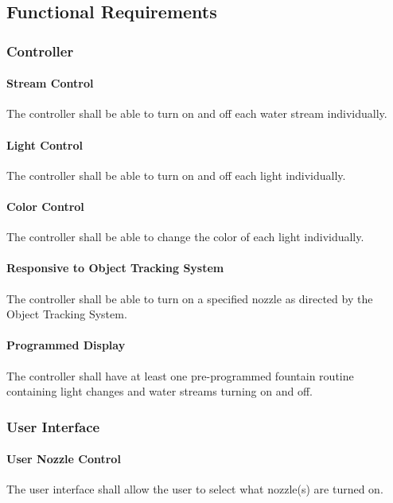 \subsection{Functional Requirements}

\subsubsection{Controller}

\paragraph{Stream Control}
The controller shall be able to turn on and off each water stream individually.

\paragraph{Light Control}
The controller shall be able to turn on and off each light individually.

\paragraph{Color Control}
The controller shall be able to change the color of each light individually.

\paragraph{Responsive to Object Tracking System} 
The controller shall be able to turn on a specified nozzle as directed by the Object Tracking System.

\paragraph{Programmed Display}
The controller shall have at least one pre-programmed fountain routine containing light changes and water streams turning on and off.

\subsubsection{User Interface}

\paragraph{User Nozzle Control}
The user interface shall allow the user to select what nozzle(s) are turned on.

